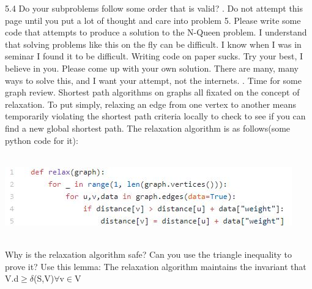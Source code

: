 \documentclass[12pt]{article}
\begin{document}
5.4 Do your subproblems follow some order that is valid?
\newpage
{}. Do not attempt this page until you put a 
lot of thought and care into problem 5. Please write
some code that attempts to produce a solution to the
N-Queen problem.
 I understand that solving problems like this on the 
 fly can be difficult. I know when I was in seminar 
 I found it to be difficult. Writing code on paper sucks.
  Try your best, I believe in you. Please come up with your
  own solution. There are many, many ways to solve this,
  and I want your attempt, not the internets.
\newpage
{}. Time for some graph review. Shortest path algorithms on graphs all fixated 
on the concept of relaxation. To put simply, relaxing an edge from
one vertex to another means temporarily violating the shortest path
criteria locally to check to see if you can find a new global shortest path.
The relaxation algorithm is as follows(some python code for it):\\\\
\centerline{\includegraphics{relax.jpg}}\\
Why is the relaxation algorithm safe? Can you use the triangle inequality to
 prove it? Use this lemma: The relaxation algorithm maintains the 
 invariant that V.d$ \geq \delta$(S,V)$ \forall $v$ \in $V\\\\\\\\
\end{document}
